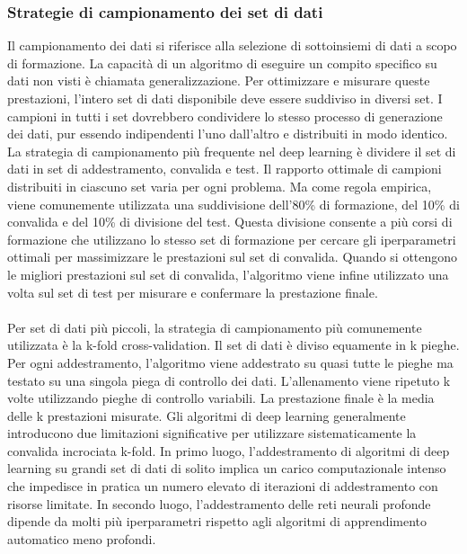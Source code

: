 \documentclass[12pt,a4paper]{report}
\begin{document}
\subsubsection{Strategie di campionamento dei set di dati}
Il campionamento dei dati si riferisce alla selezione di sottoinsiemi di dati a scopo di formazione. La capacità di un algoritmo di eseguire un compito specifico su dati non visti è chiamata generalizzazione. Per ottimizzare e misurare queste prestazioni, l'intero set di dati disponibile deve essere suddiviso in diversi set. I campioni in tutti i set dovrebbero condividere lo stesso processo di generazione dei dati, pur essendo indipendenti l'uno dall'altro e distribuiti in modo identico.
La strategia di campionamento più frequente nel deep learning è dividere il set di dati in set di addestramento, convalida e test.
Il rapporto ottimale di campioni distribuiti in ciascuno set varia per ogni problema. Ma come regola empirica, viene comunemente utilizzata una suddivisione dell'80\% di formazione, del 10\% di convalida e del 10\% di divisione del test. Questa divisione consente a più corsi di formazione che utilizzano lo stesso set di formazione per cercare gli iperparametri ottimali per massimizzare le prestazioni sul set di convalida. Quando si ottengono le migliori prestazioni sul set di convalida, l'algoritmo viene infine utilizzato una volta sul set di test per misurare e confermare la prestazione finale.\\
\\
Per set di dati più piccoli, la strategia di campionamento più comunemente utilizzata è la k-fold cross-validation. Il set di dati è diviso equamente in k pieghe. Per ogni addestramento, l'algoritmo viene addestrato su quasi tutte le pieghe ma testato su una singola piega di controllo dei dati. L'allenamento viene ripetuto k volte utilizzando pieghe di controllo variabili. La prestazione finale è la media delle k prestazioni misurate.
Gli algoritmi di deep learning generalmente introducono due limitazioni significative per utilizzare sistematicamente la convalida incrociata k-fold. In primo luogo, l'addestramento di algoritmi di deep learning su grandi set di dati di solito implica un carico computazionale intenso che impedisce in pratica un numero elevato di iterazioni di addestramento con risorse limitate. In secondo luogo, l'addestramento delle reti neurali profonde dipende da molti più iperparametri rispetto agli algoritmi di apprendimento automatico meno profondi.\\
\end{document}
